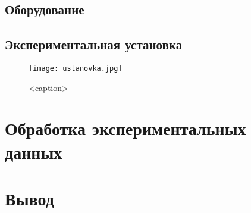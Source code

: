 \documentclass[a4paper, 14pt]{article}
\begin{document}
\subsection*{\textcolor{sub_header}{Оборудование}}



\subsection*{\textcolor{sub_header}{Экспериментальная установка}}

\begin{figure}[htbp]
    \centering
    \texttt{[image: ustanovka.jpg]}
    \caption{<caption>}
    \label{<label>}
\end{figure}

\section*{\textcolor{header}{Обработка экспериментальных данных}}



\section*{\textcolor{header}{Вывод}}
\end{document}

